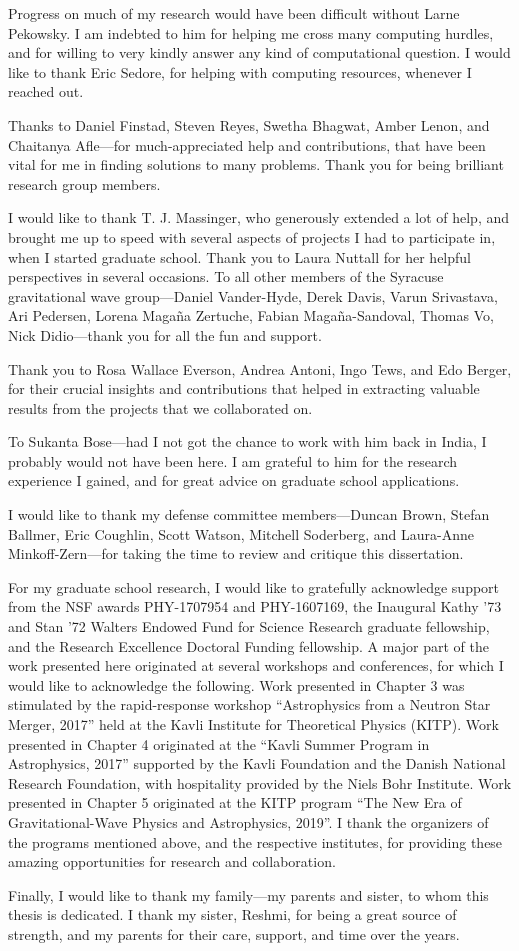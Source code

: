 Progress on much of my research would have been difficult without Larne Pekowsky. I am indebted to him for helping me cross many computing hurdles, and for willing to very kindly answer any kind of computational question. I would like to thank Eric Sedore, for helping with computing resources, whenever I reached out.

Thanks to Daniel Finstad, Steven Reyes, Swetha Bhagwat, Amber Lenon, and Chaitanya Afle---for much-appreciated help and contributions, that have been vital for me in finding solutions to many problems. Thank you for being brilliant research group members.

I would like to thank T. J. Massinger, who generously extended a lot of help, and brought me up to speed with several aspects of projects I had to participate in, when I started graduate school. Thank you to Laura Nuttall for her helpful perspectives in several occasions. To all other members of the Syracuse gravitational wave group---Daniel Vander-Hyde, Derek Davis, Varun Srivastava, Ari Pedersen, Lorena Maga\~{n}a Zertuche, Fabian Maga\~{n}a-Sandoval, Thomas Vo, Nick Didio---thank you for all the fun and support.

Thank you to Rosa Wallace Everson, Andrea Antoni, Ingo Tews, and Edo Berger, for their crucial insights and contributions that helped in extracting valuable results from the projects that we collaborated on.

To Sukanta Bose---had I not got the chance to work with him back in India, I probably would not have been here. I am grateful to him for the research experience I gained, and for great advice on graduate school applications.

I would like to thank my defense committee members---Duncan Brown, Stefan Ballmer, Eric Coughlin, Scott Watson, Mitchell Soderberg, and Laura-Anne Minkoff-Zern---for taking the time to review and critique this dissertation.

For my graduate school research, I would like to gratefully acknowledge support from the NSF awards PHY-1707954 and PHY-1607169, the Inaugural Kathy '73 and Stan '72 Walters Endowed Fund for Science Research graduate fellowship, and the Research Excellence Doctoral Funding fellowship. A major part of the work presented here originated at several workshops and conferences, for which I would like to acknowledge the following. Work presented in Chapter 3 was stimulated by the rapid-response workshop ``Astrophysics from a Neutron Star Merger, 2017'' held at the Kavli Institute for Theoretical Physics (KITP). Work presented in Chapter 4 originated at the ``Kavli Summer Program in Astrophysics, 2017'' supported by the Kavli Foundation and the Danish National Research Foundation, with hospitality provided by the Niels Bohr Institute. Work presented in Chapter 5 originated at the KITP program ``The New Era of Gravitational-Wave Physics and Astrophysics, 2019''. I thank the organizers of the programs mentioned above, and the respective institutes, for providing these amazing opportunities for research and collaboration.

Finally, I would like to thank my family---my parents and sister, to whom this thesis is dedicated. I thank my sister, Reshmi, for being a great source of strength, and my parents for their care, support, and time over the years.



